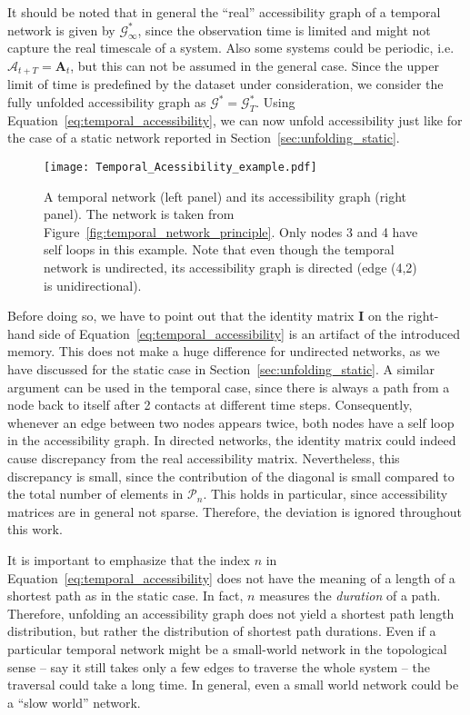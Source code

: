 It should be noted that in general the ``real'' accessibility graph of a temporal network is given by $\mathcal{G}_\infty ^*$, since the observation time is limited and might not capture the real timescale of a system.
Also some systems could be periodic, i.e. $\mathcal{A}_{t+T}=\mathbf{A}_{t}$, but this can not be assumed in the general case.
Since the upper limit of time is predefined by the dataset under consideration, we consider the fully unfolded accessibility graph as $\mathcal{G}^* = \mathcal{G}_T ^*$.
Using Equation~\eqref{eq:temporal_accessibility}, we can now unfold accessibility just like for the case of a static network reported in Section~\ref{sec:unfolding_static}.
%
\begin{figure}[htb]
\begin{center}
\texttt{[image: Temporal\_Acessibility\_example.pdf]}
\caption{A temporal network (left panel) and its accessibility graph (right panel).
The network is taken from Figure~\ref{fig:temporal_network_principle}.
Only nodes 3 and 4 have self loops in this example.
Note that even though the temporal network is undirected, its accessibility graph is directed (edge (4,2) is unidirectional).}
\label{fig:temp_acc_example}
\end{center}
\end{figure}

Before doing so, we have to point out that the identity matrix $\mathbf{I}$ on the right-hand side of Equation~\eqref{eq:temporal_accessibility} is an artifact of the introduced memory.
This does not make a huge difference for undirected networks, as we have discussed for the static case in Section~\ref{sec:unfolding_static}.
A similar argument can be used in the temporal case, since there is always a path from a node back to itself after 2 contacts at different time steps.
Consequently, whenever an edge between two nodes appears twice, both nodes have a self loop in the accessibility graph.
In directed networks, the identity matrix could indeed cause discrepancy from the real accessibility matrix.
Nevertheless, this discrepancy is small, since the contribution of the diagonal is small compared to the total number of elements in $\mathcal{P}_n$.
This holds in particular, since accessibility matrices are in general not sparse.
Therefore, the deviation is ignored throughout this work.

It is important to emphasize that the index $n$ in Equation~\eqref{eq:temporal_accessibility} does not have the meaning of a length of a shortest path as in the static case.
In fact, $n$ measures the \emph{duration} of a path.
Therefore, unfolding an accessibility graph does not yield a shortest path length distribution, but rather the distribution of shortest path durations.
Even if a particular temporal network might be a small-world network in the topological sense -- say it still takes only a few edges to traverse the whole system -- the traversal could take a long time.
In general, even a small world network could be a ``slow world'' network. 

